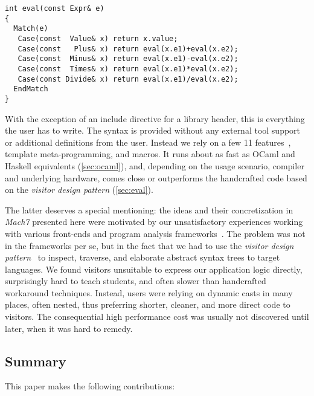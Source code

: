 
\begin{lstlisting}[columns=flexible]
int eval(const Expr& e)
{
  Match(e)
   Case(const  Value& x) return x.value;
   Case(const   Plus& x) return eval(x.e1)+eval(x.e2);
   Case(const  Minus& x) return eval(x.e1)-eval(x.e2);
   Case(const  Times& x) return eval(x.e1)*eval(x.e2);
   Case(const Divide& x) return eval(x.e1)/eval(x.e2);
  EndMatch
}
\end{lstlisting}

\noindent
With the exception of an include directive for a library header, this is everything the user has to write.
The syntax is provided without any external tool support or additional definitions from the user. Instead we rely on a 
few \Cpp{}11 features~\cite{C++11}, template meta-programming, and macros. It runs 
about as fast as OCaml and Haskell equivalents (\textsection\ref{sec:ocaml}), and, depending 
on the usage scenario, compiler and underlying hardware, comes close or 
outperforms the handcrafted \Cpp{} code based on the \emph{visitor design pattern} 
(\textsection\ref{sec:eval}).

The latter deserves a special mentioning: the ideas and their concretization in 
\emph{Mach7} presented here were motivated by our unsatisfactory experiences working 
with various \Cpp{} front-ends and program analysis frameworks~\cite{Pivot09,Phoenix,Clang}. 
The problem was not in the frameworks per se, but in the fact that we had to use
the \emph{visitor design pattern}~\cite{DesignPatterns1993} to inspect, traverse, and 
elaborate abstract syntax trees to target languages. We found visitors 
unsuitable to express our application logic directly, surprisingly hard to teach 
students, and often slower than handcrafted workaround techniques. Instead, 
users were relying on dynamic casts in many places, often nested, thus preferring 
shorter, cleaner, and more direct code to visitors. The consequential high 
performance cost was usually not discovered until later, when it was hard to 
remedy.

\subsection{Summary}

This paper makes the following contributions:

